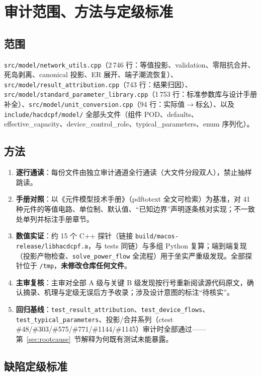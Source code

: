 \documentclass[11pt,a4paper,fontset=fandol]{ctexart}
\newcommand{\file}[1]{\texttt{#1}}
\begin{document}
\newpage

\section{审计范围、方法与定级标准}

\subsection{范围}

\file{src/model/network\_utils.cpp}（2\,746 行：等值投影、validation、零阻抗合并、死岛剥离、canonical 投影、ER 展开、端子潮流恢复）、\file{src/model/result\_attribution.cpp}（743 行：结果归因）、\file{src/model/standard\_parameter\_library.cpp}（1\,753 行：标准参数库与设计手册补全）、\file{src/model/unit\_conversion.cpp}（94 行：实际值$\to$标幺）、以及 \file{include/hacdcpf/model/} 全部头文件（组件 POD、defaults、effective\_capacity、device\_control\_role、typical\_parameters、enum 序列化）。

\subsection{方法}

\begin{enumerate}
  \item \textbf{逐行通读}：每份文件由独立审计通道全行通读（大文件分段双人），禁止抽样跳读。
  \item \textbf{手册对照}：以《元件模型技术手册》（pdftotext 全文可检索）为基准，对 41 种元件的等值电路、单位制、默认值、``已知边界''声明逐条核对实现；不一致处单列并标注手册章节。
  \item \textbf{数值实证}：约 15 个 C++ 探针（链接 \file{build/macos-release/libhacdcpf.a}，与 tests 同链）与多组 Python 复算；端到端复现（投影产物检查、\file{solve\_power\_flow} 全流程）用于坐实严重级发现。全部探针位于 \file{/tmp}，\textbf{未修改仓库任何文件}。
  \item \textbf{主审复核}：主审对全部 A 级与关键 B 级发现按行号重新阅读源代码原文，确认摘录、机理与定级无误后方予收录；涉及设计意图的标注``待核实''。
  \item \textbf{回归基线}：\file{test\_result\_attribution}、\file{test\_device\_flows}、\file{test\_typical\_parameters}、投影/合并系列（ctest \#48/\#303/\#575/\#771/\#1144/\#1145）审计时全部通过——第~\ref{sec:rootcause}~节解释为何既有测试未能暴露。
\end{enumerate}

\subsection{缺陷定级标准}
\end{document}

